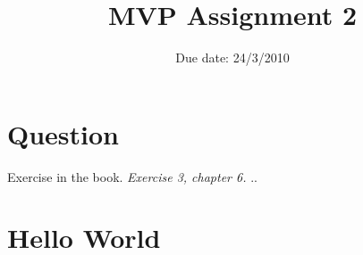 \documentclass{article}
\title{MVP Assignment 2}
\date{Due date: 24/3/2010}
\begin{document}
\maketitle

\newcommand{\question}[1]{#1}
\newcommand{\answer}[1]{}


%
%
\answer{
\begin{flushleft}
{\bf Group room:} FIXME\\
{\bf Group number:} FIXME
\end{flushleft}
}

\section{Question}

\begin{ExerciseList}
\Exercise Exercise in the book.
\Question \emph{Exercise 3, chapter 6.}
\Answer .. %

\end{ExerciseList}

\section{Hello World}
\end{document}
